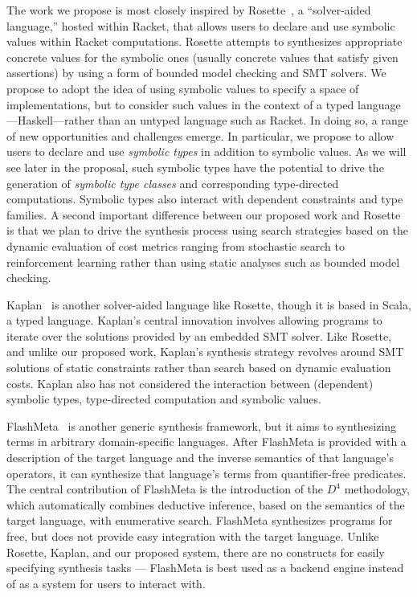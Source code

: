 The work we propose is most closely inspired by
Rosette~\cite{Torlak:rosette-onward,Torlak:rosette-pldi}, a
``solver-aided language,'' hosted within Racket, that allows users to
declare and use symbolic values within Racket computations.  Rosette
attempts to synthesizes appropriate concrete values for the symbolic
ones (usually concrete values that satisfy given assertions) by using
a form of bounded model checking and SMT solvers.  We propose to adopt
the idea of using symbolic values to specify a space of
implementations, but to consider such values in the context of a typed
language---Haskell---rather than an untyped language such as Racket.
In doing so, a range of new opportunities and challenges emerge.  In
particular, we propose to allow users to declare and use
\emph{symbolic types} in addition to symbolic values.  As we will see
later in the proposal, such symbolic types have the potential to drive
the generation of \emph{symbolic type classes} and corresponding
type-directed computations.  Symbolic types also interact with
dependent constraints and type families.  A second important
difference between our proposed work and Rosette is that we plan to
drive the synthesis process 
using search strategies based on the dynamic evaluation of cost metrics
ranging from stochastic search to reinforcement learning rather than using
static analyses such as bounded model checking.

Kaplan~\cite{kaplan} is another solver-aided language like Rosette,
though it is based in Scala, a typed language.  Kaplan's central
innovation involves allowing programs to iterate over the solutions
provided by an embedded SMT solver.  Like Rosette, and unlike our
proposed work, Kaplan's synthesis strategy revolves around SMT solutions
of static constraints rather than search based on dynamic evaluation
costs.  Kaplan also has not considered the interaction between (dependent) 
symbolic types, type-directed computation and symbolic values.

FlashMeta~\cite{Polozov:Flashmeta} is another generic synthesis framework, but
it aims to synthesizing terms in arbitrary domain-specific languages.  After
FlashMeta is provided with a description of the target language and the inverse
semantics of that language's operators, it can synthesize that language's
terms from quantifier-free predicates.  The central contribution of
FlashMeta is the introduction of the $D^4$ methodology, which automatically
combines deductive inference, based on the semantics of the target language,
with enumerative search.  FlashMeta synthesizes programs for free, but does not
provide easy integration with the target language.  Unlike Rosette, Kaplan, and
our proposed system, there are no constructs for easily
specifying synthesis tasks --- FlashMeta is best used as a backend
engine instead of as a system for users to interact with.

